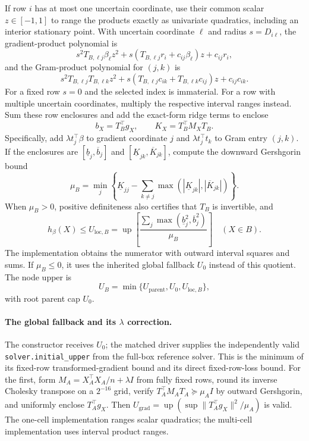 If row $i$ has at most one uncertain coordinate, use their common scalar $z\in[-1,1]$ to range the products exactly as univariate quadratics, including an interior stationary point. With uncertain coordinate $\ell$ and radius $s=D_{i\ell}$, the gradient-product polynomial is
\[
 s^2T_{B,\ell j}\beta_\ell z^2
 +s(T_{B,\ell j}r_i+c_{ij}\beta_\ell)z+c_{ij}r_i,
\]
and the Gram-product polynomial for $(j,k)$ is
\[
 s^2T_{B,\ell j}T_{B,\ell k}z^2
 +s(T_{B,\ell j}c_{ik}+T_{B,\ell k}c_{ij})z+c_{ij}c_{ik}.
\]
For a fixed row $s=0$ and the selected index is immaterial. For a row with multiple uncertain coordinates, multiply the respective interval ranges instead. Sum these row enclosures and add the exact-form ridge terms to enclose
\[
 b_X=T_B^\top g_X,\qquad K_X=T_B^\top M_XT_B.
\]
Specifically, add $\lambda t_j^\top\beta$ to gradient coordinate $j$ and $\lambda t_j^\top t_k$ to Gram entry $(j,k)$. If the enclosures are $[\underline b_j,\overline b_j]$ and $[\underline K_{jk},\overline K_{jk}]$, compute the downward Gershgorin bound
\[
 \mu_B=\min_j\left\{\underline K_{jj}
 -\sum_{k\ne j}\max(|\underline K_{jk}|,|\overline K_{jk}|)\right\}.
\]
When $\mu_B>0$, positive definiteness also certifies that $T_B$ is invertible, and
\[
 h_\beta(X)\leq U_{\mathrm{loc},B}
 =\operatorname{up}\!\left[\frac{\sum_j\max(\underline b_j^2,\overline b_j^2)}{\mu_B}\right]
 \quad(X\in B).
\]
The implementation obtains the numerator with outward interval squares and sums. If $\mu_B\leq0$, it uses the inherited global fallback $U_0$ instead of this quotient. The node upper is
\[
 U_B=\min\{U_{\mathrm{parent}},U_0,U_{\mathrm{loc},B}\},
\]
with root parent cap $U_0$.

\paragraph{The global fallback and its $\lambda$ correction.}
The constructor receives $U_0$; the matched driver supplies the independently valid \texttt{solver.initial\_upper} from the full-box reference solver. This is the minimum of its fixed-row transformed-gradient bound and its direct fixed-row-loss bound. For the first, form $M_A=X_A^\top X_A/n+\lambda I$ from fully fixed rows, round its inverse Cholesky transpose on a $2^{-16}$ grid, verify $T_A^\top M_AT_A\succeq\mu_AI$ by outward Gershgorin, and uniformly enclose $T_A^\top g_X$. Then $U_{\mathrm{grad}}=\operatorname{up}(\sup\|T_A^\top g_X\|^2/\mu_A)$ is valid. The one-cell implementation ranges scalar quadratics; the multi-cell implementation uses interval product ranges.

